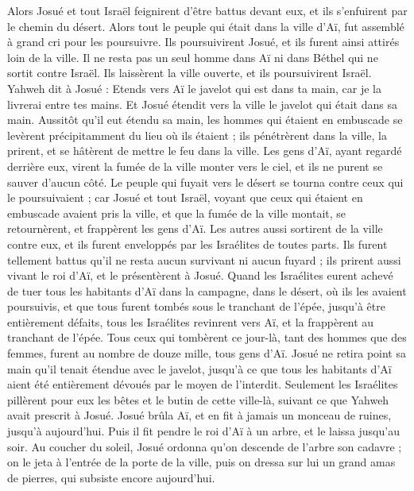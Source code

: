 \begin{multicols}{2}
Alors Josué et tout Israël feignirent d’être battus devant eux, et ils s’enfuirent par le chemin du désert.
Alors tout le peuple qui était dans la ville d’Aï, fut assemblé à grand cri pour les poursuivre. Ils poursuivirent Josué, et ils furent ainsi attirés loin de la ville.
Il ne resta pas un seul homme dans Aï ni dans Béthel qui ne sortit contre Israël. Ils laissèrent la ville ouverte, et ils poursuivirent Israël.
Yahweh dit à Josué : Etends vers Aï le javelot qui est dans ta main, car je la livrerai entre tes mains. Et Josué étendit vers la ville le javelot qui était dans sa main.
Aussitôt qu’il eut étendu sa main, les hommes qui étaient en embuscade se levèrent précipitamment du lieu où ils étaient ; ils pénétrèrent dans la ville, la prirent, et se hâtèrent de mettre le feu dans la ville.
Les gens d’Aï, ayant regardé derrière eux, virent la fumée de la ville monter vers le ciel, et ils ne purent se sauver d’aucun côté. Le peuple qui fuyait vers le désert se tourna contre ceux qui le poursuivaient ;
car Josué et tout Israël, voyant que ceux qui étaient en embuscade avaient pris la ville, et que la fumée de la ville montait, se retournèrent, et frappèrent les gens d’Aï.
Les autres aussi sortirent de la ville contre eux, et ils furent enveloppés par les Israélites de toutes parts. Ils furent tellement battus qu’il ne resta aucun survivant ni aucun fuyard ;
ils prirent aussi vivant le roi d’Aï, et le présentèrent à Josué.
Quand les Israélites eurent achevé de tuer tous les habitants d’Aï dans la campagne, dans le désert, où ils les avaient poursuivis, et que tous furent tombés sous le tranchant de l’épée, jusqu’à être entièrement défaits, tous les Israélites revinrent vers Aï, et la frappèrent au tranchant de l’épée.
Tous ceux qui tombèrent ce jour-là, tant des hommes que des femmes, furent au nombre de douze mille, tous gens d’Aï.
Josué ne retira point sa main qu’il tenait étendue avec le javelot, jusqu’à ce que tous les habitants d’Aï aient été entièrement dévoués par le moyen de l'interdit.
Seulement les Israélites pillèrent pour eux les bêtes et le butin de cette ville-là, suivant ce que Yahweh avait prescrit à Josué.
Josué brûla Aï, et en fit à jamais un monceau de ruines, jusqu’à aujourd’hui.
Puis il fit pendre le roi d’Aï à un arbre, et le laissa jusqu’au soir. Au coucher du soleil, Josué ordonna qu’on descende de l’arbre son cadavre ; on le jeta à l’entrée de la porte de la ville, puis on dressa sur lui un grand amas de pierres, qui subsiste encore aujourd’hui.

\end{multicols}

